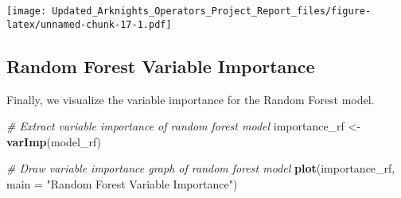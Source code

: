 \documentclass[
]{article}
\newenvironment{Shaded}{\begin{snugshade}}{\end{snugshade}}
\newcommand{\AttributeTok}[1]{\textcolor[rgb]{0.13,0.29,0.53}{#1}}
\newcommand{\CommentTok}[1]{\textcolor[rgb]{0.56,0.35,0.01}{\textit{#1}}}
\newcommand{\FunctionTok}[1]{\textcolor[rgb]{0.13,0.29,0.53}{\textbf{#1}}}
\newcommand{\NormalTok}[1]{#1}
\newcommand{\OtherTok}[1]{\textcolor[rgb]{0.56,0.35,0.01}{#1}}
\newcommand{\SpecialCharTok}[1]{\textcolor[rgb]{0.81,0.36,0.00}{\textbf{#1}}}
\newcommand{\StringTok}[1]{\textcolor[rgb]{0.31,0.60,0.02}{#1}}
\begin{document}
\begin{Shaded}
\end{Shaded}

\texttt{[image: Updated\_Arknights\_Operators\_Project\_Report\_files/figure-latex/unnamed-chunk-17-1.pdf]}

\subsection{Random Forest Variable
Importance}\label{random-forest-variable-importance}

Finally, we visualize the variable importance for the Random Forest
model.

\begin{Shaded}
\begin{Highlighting}[]
\CommentTok{\# Extract variable importance of random forest model}
\NormalTok{importance\_rf }\OtherTok{\textless{}{-}} \FunctionTok{varImp}\NormalTok{(model\_rf)}

\CommentTok{\# Draw variable importance graph of random forest model}
\FunctionTok{plot}\NormalTok{(importance\_rf, }\AttributeTok{main =} \StringTok{"Random Forest Variable Importance"}\NormalTok{)}
\end{Highlighting}
\end{Shaded}
\end{document}
